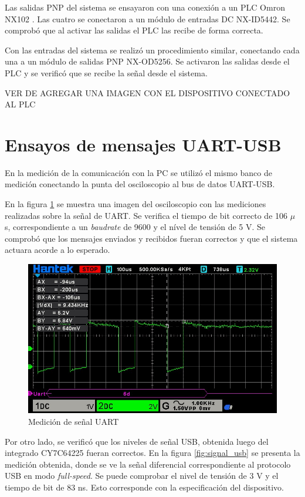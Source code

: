 Las salidas PNP del sistema se ensayaron con una conexión a un PLC Omron NX102 \citep{web_nx102}. Las cuatro se conectaron a un módulo de entradas DC NX-ID5442. Se comprobó que al activar las salidas el PLC las recibe de forma correcta.

Con las entradas del sistema se realizó un procedimiento similar, conectando cada una a un módulo de salidas PNP NX-OD5256. Se activaron las salidas desde el PLC y se verificó que se recibe la señal desde el sistema.

VER DE AGREGAR UNA IMAGEN CON EL DISPOSITIVO CONECTADO AL PLC

\section{Ensayos de mensajes UART-USB}

En la medición de la comunicación con la PC se utilizó el mismo banco de medición conectando la punta del osciloscopio al bus de datos UART-USB.

En la figura \ref{fig:signal_uart} se muestra una imagen del osciloscopio con las mediciones realizadas sobre la señal de UART. Se verifica el tiempo de bit correcto de 106 $\mu$s, correspondiente a un \textit{baudrate} de 9600 y el nível de tensión de 5 V. Se comprobó que los mensajes enviados y recibidos fueran correctos y que el sistema actuara acorde a lo esperado.

\begin{figure}[htbp]
	\centering
	\includegraphics[scale=0.6]{./Figures/bit_time_uart.jpeg}
	\caption{Medición de señal UART}
	\label{fig:signal_uart}
\end{figure}

Por otro lado, se verificó que los niveles de señal USB, obtenida luego del integrado CY7C64225 fueran correctos. En la figura \ref{fig:signal_usb} se presenta la medición obtenida, donde se ve la señal diferencial correspondiente al protocolo USB en modo \textit{full-speed}. Se puede comprobar el nivel de tensión de 3 V y el tiempo de bit de 83 ns. Esto corresponde con la especificación del dispositivo.

